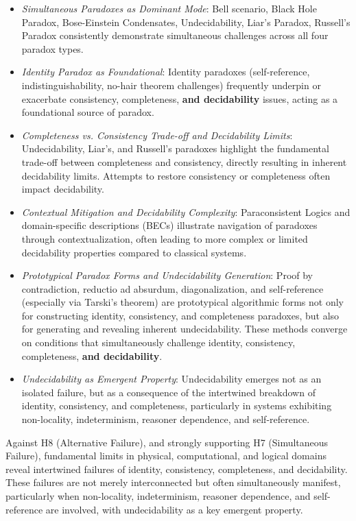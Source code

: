 \documentclass{article}
\begin{document}
	\begin{itemize}
		\item \textit{Simultaneous Paradoxes as Dominant Mode}: Bell scenario, Black Hole Paradox, Bose-Einstein Condensates, Undecidability, Liar's Paradox, Russell's Paradox consistently demonstrate simultaneous challenges across all four paradox types.
		\item \textit{Identity Paradox as Foundational}: Identity paradoxes (self-reference, indistinguishability, no-hair theorem challenges) frequently underpin or exacerbate consistency, completeness, \textbf{and decidability} issues, acting as a foundational source of paradox.
		\item \textit{Completeness vs. Consistency Trade-off and Decidability Limits}: Undecidability, Liar's, and Russell's paradoxes highlight the fundamental trade-off between completeness and consistency, directly resulting in inherent decidability limits.  Attempts to restore consistency or completeness often impact decidability.
		\item \textit{Contextual Mitigation and Decidability Complexity}: Paraconsistent Logics and domain-specific descriptions (BECs) illustrate navigation of paradoxes through contextualization, often leading to more complex or limited decidability properties compared to classical systems.
		\item \textit{Prototypical Paradox Forms and Undecidability Generation}: Proof by contradiction, reductio ad absurdum, diagonalization, and self-reference (especially via Tarski's theorem) are prototypical algorithmic forms not only for constructing identity, consistency, and completeness paradoxes, but also for generating and revealing inherent undecidability. These methods converge on conditions that simultaneously challenge identity, consistency, completeness, \textbf{and decidability}.
		\item \textit{Undecidability as Emergent Property}: Undecidability emerges not as an isolated failure, but as a consequence of the intertwined breakdown of identity, consistency, and completeness, particularly in systems exhibiting non-locality, indeterminism, reasoner dependence, and self-reference.
	\end{itemize}
	
	Against H8 (Alternative Failure), and strongly supporting H7 (Simultaneous Failure), fundamental limits in physical, computational, and logical domains reveal intertwined failures of identity, consistency, completeness, and decidability. These failures are not merely interconnected but often simultaneously manifest, particularly when non-locality, indeterminism, reasoner dependence, and self-reference are involved, with undecidability as a key emergent property.
	
\end{document}
